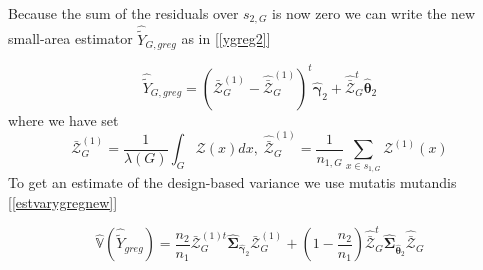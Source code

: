 \documentclass[a4paper,12pt,leqno, titlepage]{article}
\newcommand{\VAR}{\mathbb{V}}
\begin{document}
{{\noindent Because the sum of the residuals over $s_{2,G}$ is now zero we can write the new small-area estimator $\hat{\tilde{Y}}_{G,greg}$ as in [\ref{ygreg2}]

\begin{equation}\label{extsmallareaest1}
\hat{\tilde{Y}}_{G,greg}
= (\bar{\pmb{\mathcal{Z}}}_G^{(1)}-\hat{\bar{\pmb{\mathcal{Z}}}}_G^{(1)})^t\hat{\pmb{\gamma}}_2 +
\hat{\bar{\pmb{\mathcal{Z}}}}_G^t\hat{\pmb{\theta}}_{2}
\end{equation}
where we have set
 $$\bar{\pmb{\mathcal{Z}}}_G^{(1)}=\frac{1}{\lambda(G)}\int_G \mathcal{Z}(x)dx,\; \hat{\bar{\pmb{\mathcal{Z}}}}_G^{(1)}=
 \frac{1}{n_{1,G}}\sum_{x\in{s_{1,G}}}\pmb{\mathcal{Z}}^{(1)}(x)$$
 To get an estimate of the design-based variance we use mutatis mutandis [\ref{estvarygregnew}]

 \begin{equation}\label{estvarygreg}
\hat{\VAR}(\hat{\tilde{Y}}_{greg})=\frac{n_2}{n_1}\bar{\pmb{\mathcal{Z}}}_G^{(1)t}\hat{\pmb{\Sigma}}_{\hat{\pmb{\gamma}}_2}
\bar{\pmb{\mathcal{Z}}}_G^{(1)}+(1-\frac{n_2}{n_1})\hat{\bar{\pmb{\mathcal{Z}}}}_G^t\hat{\pmb{\Sigma}}_{\hat{\pmb{\theta}}_2}
\hat{\bar{\pmb{\mathcal{Z}}}}_G
\end{equation}



}}
\end{document}
